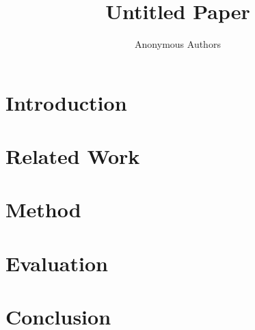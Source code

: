 \documentclass[sigconf,anonymous,review]{acmart}
\title{Untitled Paper}
\author{Anonymous Authors}
\begin{document}
\maketitle
\begin{abstract}
\end{abstract}
\section{Introduction}
\section{Related Work}
\section{Method}
\section{Evaluation}
\section{Conclusion}


\end{document}
